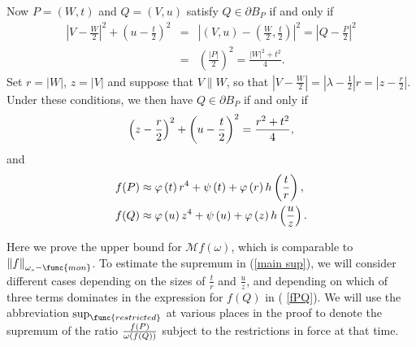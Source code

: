 \documentclass{amsart}
\theoremstyle{plain}
\numberwithin{equation}{section}
\begin{document}
Now $P=\left( W,t\right) $ and $Q=\left( V,u\right) $ satisfy $Q\in \partial
B_{P}$ if and only if 
\begin{eqnarray*}
\left\vert V-\frac{W}{2}\right\vert ^{2}+\left( u-\frac{t}{2}\right) ^{2}
&=&\left\vert \left( V,u\right) -\left( \frac{W}{2},\frac{t}{2}\right)
\right\vert ^{2}=\left\vert Q-\frac{P}{2}\right\vert ^{2} \\
&=&\left( \frac{\left\vert P\right\vert }{2}\right) ^{2}=\frac{\left\vert
W\right\vert ^{2}+t^{2}}{4}.
\end{eqnarray*}%
Set $r=\left\vert W\right\vert $, $z=\left\vert V\right\vert $ and suppose
that $V\parallel W$, so that $\left\vert V-\frac{W}{2}\right\vert
=\left\vert \lambda -\frac{1}{2}\right\vert r=\left\vert z-\frac{r}{2}%
\right\vert $. Under these conditions, we then have $Q\in \partial B_{P}$ if
and only if%
\begin{equation}
\left( z-\frac{r}{2}\right) ^{2}+\left( u-\frac{t}{2}\right) ^{2}=\frac{%
r^{2}+t^{2}}{4},  \label{bdry_cond}
\end{equation}%
and 
\begin{align}
f(P)& \approx \varphi \left( t\right) r^{4}+\psi \left( t\right) +\varphi
\left( r\right) h\left( \frac{t}{r}\right) ,  \label{fPQ} \\
f(Q)& \approx \varphi \left( u\right) z^{4}+\psi \left( u\right) +\varphi
\left( z\right) h\left( \frac{u}{z}\right) .  \notag
\end{align}

Here we prove the upper bound for $\mathcal{M}f\left( \omega \right) $,
which is comparable to $\left\Vert f\right\Vert _{\omega _{s}-\func{mon}}$.
To estimate the supremum in (\ref{main sup}), we will consider different
cases depending on the sizes of $\frac{t}{r}$ and $\frac{u}{z}$, and
depending on which of three terms dominates in the expression for $f(Q)$ in (%
\ref{fPQ}). We will use the abbreviation $\sup_{\func{restricted}}$ at
various places in the proof to denote the supremum of the ratio $\frac{%
f\left( P\right) }{\omega \left( f\left( Q\right) \right) }$ subject to the
restrictions in force at that time.

\bigskip
\end{document}
